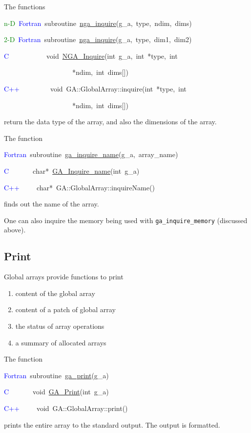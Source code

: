 The functions
\begin{lyxcode}
\textcolor{green}{n-D}~\textcolor{blue}{Fortran}~subroutine~\href{http://www.emsl.pnl.gov/docs/global/ga_ops.html\#ga_inquire}{nga\_{}inquire}(g\_a,~type,~ndim,~dims)~

\textcolor{green}{2-D}~\textcolor{blue}{Fortran}~subroutine~\href{http://www.emsl.pnl.gov/docs/global/ga_ops.html\#ga_inquire}{nga\_{}inquire}(g\_a,~type,~dim1,~dim2)~

\textcolor{blue}{C}~~~~~~~~~~~void~\href{http://www.emsl.pnl.gov/docs/global/c_nga_ops.html\#ga_inquire}{NGA\_{}Inquire}(int~g\_a,~int~{*}type,~int~

~~~~~~~~~~~~~~~~~~~~{*}ndim,~int~dims{[}{]})~

\textcolor{blue}{C++}~~~~~~~~~void~GA::GlobalArray::inquire(int~{*}type,~int~

~~~~~~~~~~~~~~~~~~~~{*}ndim,~int~dims{[}{]})
\end{lyxcode}
return the data type of the array, and also the dimensions of the
array.

The function
\begin{lyxcode}
\textcolor{blue}{Fortran}~subroutine~\href{http://www.emsl.pnl.gov/docs/global/ga_ops.html\#ga_inquire_name}{ga\_{}inquire\_{}name}(g\_a,~array\_name)~

\textcolor{blue}{C}~~~~~~~char{*}~\href{http://www.emsl.pnl.gov/docs/global/c_nga_ops.html\#ga_inquire_name}{GA\_{}Inquire\_{}name}(int~g\_a)~~

\textcolor{blue}{C++}~~~~~char{*}~GA::GlobalArray::inquireName()
\end{lyxcode}
finds out the name of the array.

One can also inquire the memory being used with \texttt{ga\_inquire\_memory}
(discussed above). 


\subsection{Print }

Global arrays provide functions to print
\begin{enumerate}
\item content of the global array 
\item content of a patch of global array 
\item the status of array operations 
\item a summary of allocated arrays
\end{enumerate}
The function
\begin{lyxcode}
\textcolor{blue}{Fortran}~subroutine~\href{http://www.emsl.pnl.gov/docs/global/ga_ops.html\#ga_print}{ga\_{}print}(g\_a)~

\textcolor{blue}{C}~~~~~~~void~\href{http://www.emsl.pnl.gov/docs/global/c_nga_ops.html\#ga_print}{GA\_{}Print}(int~g\_a)~

\textcolor{blue}{C++}~~~~~void~GA::GlobalArray::print()
\end{lyxcode}
prints the entire array to the standard output. The output is formatted.

